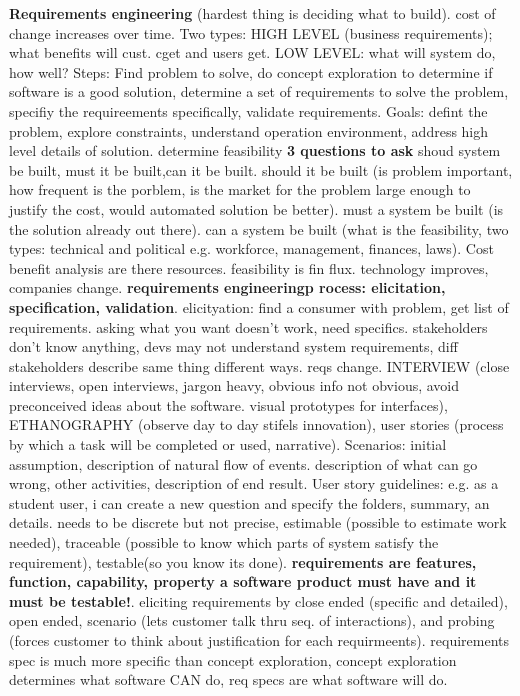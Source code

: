 \documentclass[10pt]{article}
\begin{document}
\begin{landscape}
\begin{multicols*}{6}
\textbf{Requirements engineering} (hardest thing is deciding what to build). cost of change increases over time. Two types: HIGH LEVEL (business requirements); what benefits will cust. cget and users get. LOW LEVEL: what will system do, how well? 
Steps: Find problem to solve, do concept exploration to determine if software is a good solution, determine a set of requirements to solve the problem, specifiy the requireements specifically, validate requirements. 
Goals: defint the problem, explore constraints, understand operation environment, address high level details of solution. determine feasibility \textbf{3 questions to ask} shoud system be built, must it be built,can it be built. should it be built (is problem important, how frequent is the porblem, is the market for the problem large enough to justify the cost, would automated solution be better). must a system be built (is the solution already out there). can a system be built (what is the feasibility, two types: technical and political e.g. workforce, management, finances, laws). Cost benefit analysis are there resources. feasibility is fin flux. technology improves, companies change. \textbf{requirements engineeringp rocess: elicitation, specification, validation}. elicityation: find a consumer with problem, get list of requirements. asking what you want doesn't work, need specifics. stakeholders don't know anything, devs may not understand system requirements, diff stakeholders describe same thing different ways. reqs change. INTERVIEW (close interviews, open interviews, jargon heavy, obvious info not obvious, avoid preconceived ideas about the software. visual prototypes for interfaces), ETHANOGRAPHY (observe day to day stifels innovation), user stories (process by which a task will be completed or used, narrative). Scenarios: initial assumption, description of natural flow of events. description of what can go wrong, other activities, description of end result.
User story guidelines: e.g. as a student user, i can create a new question and specify the folders, summary, an details. needs to be discrete but not precise, estimable (possible to estimate work needed), traceable (possible to know which parts of system satisfy the requirement), testable(so you know its done). \textbf{requirements are features, function, capability, property a software product must have and it must be testable!}. eliciting requirements by close ended (specific and detailed), open ended, scenario (lets customer talk thru seq. of interactions), and probing (forces customer to think about justification for each requirmeents). requirements spec is much more specific than concept exploration, concept exploration determines what software CAN do, req specs are what software will do. 

\end{multicols*}
\end{landscape}
\end{document}
